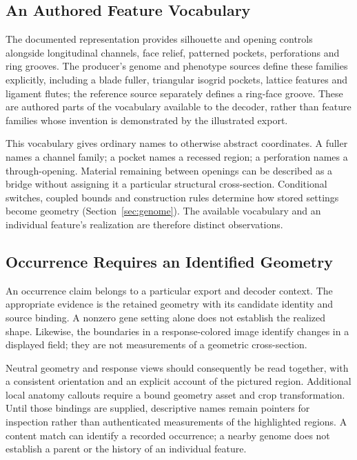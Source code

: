 \subsection{An Authored Feature Vocabulary}
The documented representation provides silhouette and opening controls alongside longitudinal channels, face relief, patterned pockets, perforations and ring grooves. The producer's genome and phenotype sources define these families explicitly, including a blade fuller, triangular isogrid pockets, lattice features and ligament flutes; the reference source separately defines a ring-face groove\cite{repo}. These are authored parts of the vocabulary available to the decoder, rather than feature families whose invention is demonstrated by the illustrated export.

This vocabulary gives ordinary names to otherwise abstract coordinates. A fuller names a channel family; a pocket names a recessed region; a perforation names a through-opening. Material remaining between openings can be described as a bridge without assigning it a particular structural cross-section. Conditional switches, coupled bounds and construction rules determine how stored settings become geometry (Section~\ref{sec:genome}). The available vocabulary and an individual feature's realization are therefore distinct observations.

\subsection{Occurrence Requires an Identified Geometry}
An occurrence claim belongs to a particular export and decoder context. The appropriate evidence is the retained geometry with its candidate identity and source binding. A nonzero gene setting alone does not establish the realized shape. Likewise, the boundaries in a response-colored image identify changes in a displayed field; they are not measurements of a geometric cross-section.

Neutral geometry and response views should consequently be read together, with a consistent orientation and an explicit account of the pictured region. Additional local anatomy callouts require a bound geometry asset and crop transformation. Until those bindings are supplied, descriptive names remain pointers for inspection rather than authenticated measurements of the highlighted regions. A content match can identify a recorded occurrence; a nearby genome does not establish a parent or the history of an individual feature.

